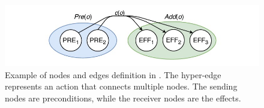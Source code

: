 \begin{figure}[t]
    \centering
    \includegraphics[width=1\textwidth]{figures/images/ch4/nodes_mapping.jpg}
    \caption{Example of nodes and edges definition in \cite{shen2020learning}. The hyper-edge represents an action that connects multiple nodes. The sending nodes are preconditions, while the receiver nodes are the effects.}
    \label{fig:nodes_mapping}
\end{figure}
